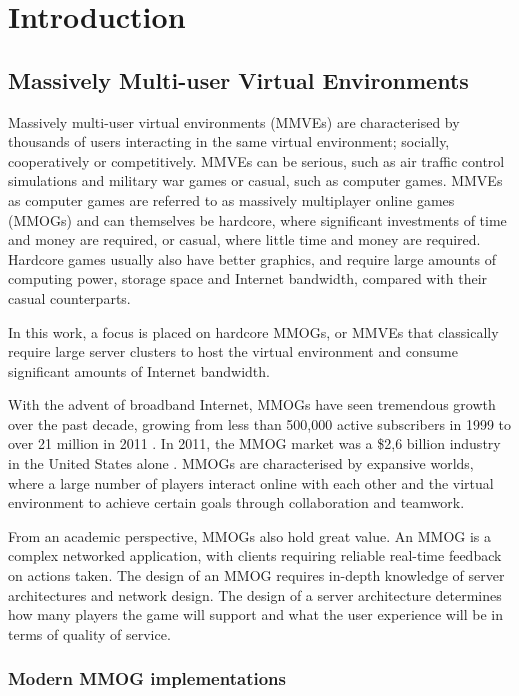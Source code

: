 \chapter{Introduction}
\label{chp:INTRO}



\section{Massively Multi-user Virtual Environments}

Massively multi-user virtual environments (MMVEs) are characterised by thousands of users interacting in the same virtual environment; socially, cooperatively or competitively. MMVEs can be serious, such as air traffic control simulations and military war games or casual, such as computer games. MMVEs as computer games are referred to as massively multiplayer online games (MMOGs) and can themselves be hardcore, where significant investments of time and money are required, or casual, where little time and money are required. Hardcore games usually also have better graphics, and require large amounts of computing power, storage space and Internet bandwidth, compared with their casual counterparts.

In this work, a focus is placed on hardcore MMOGs, or MMVEs that classically require large server clusters to host the virtual environment and consume significant amounts of Internet bandwidth.

With the advent of broadband Internet, MMOGs have seen tremendous growth over the past decade, growing from less than 500,000 active subscribers in 1999 to over 21 million in 2011 \cite{mmo_growth_chart}. In 2011, the MMOG market was a \$2,6 billion industry in the United States alone \cite{newzoo_mmo_report}. MMOGs are characterised by expansive worlds, where a large number of players interact online with each other and the virtual environment to achieve certain goals through collaboration and teamwork.

From an academic perspective, MMOGs also hold great value. An MMOG is a complex networked application, with clients requiring reliable real-time feedback on actions taken. The design of an MMOG requires in-depth knowledge of server architectures and network design. The design of a server architecture determines how many players the game will support and what the user experience will be in terms of quality of service.

\subsection{Modern MMOG implementations}
\label{modern_mmogs}

